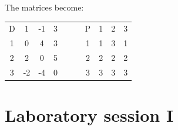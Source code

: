 \documentclass[12pt, a4paper]{report}
\newtheorem[style=M,bodystyle=\normalfont]{theorem}{Theorem}
\newtheorem[style=M,bodystyle=\normalfont]{corollary}{Corollary}
\newtheorem[style=M,bodystyle=\normalfont]{lemma}{Lemma}
\newtheorem[style=M,bodystyle=\normalfont]{definition}{Definition}
\begin{document}
\begin{enumerate}
                The matrices become: 
                \begin{table}[H]
                    \centering
                    \begin{tabular}{c|ccccc|ccc}
                    D & 1        & -1       & 3          & $\:\:\:\:\:\:$ & P & 1 & 2 & 3  \\ \cline{1-4} \cline{6-9} 
                    1 & 0        & 4        & 3          &                & 1 & 1 & 3 & 1  \\
                    2 & 2        & 0        & 5          &                & 2 & 2 & 2 & 2  \\
                    3 & -2       & -4       & 0          &                & 3 & 3 & 3 & 3  \\ 
                    \end{tabular}
                \end{table}
        \end{enumerate}

\newpage

\chapter{Laboratory session I}
\end{document}
